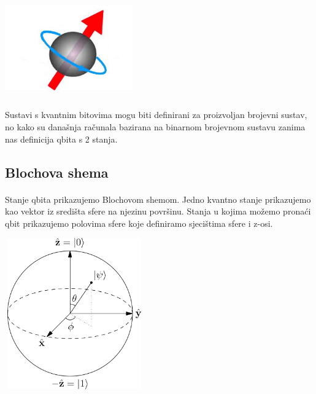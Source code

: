 \documentclass[times, utf8, zavrsni]{fer}
\begin{document}
\begin{center}
\includegraphics[width=55mm, height=40mm]{spin}
\end{center}

\paragraph{}
Sustavi s kvantnim bitovima mogu biti definirani za proizvoljan brojevni sustav, no kako su današnja računala bazirana na binarnom brojevnom sustavu zanima nas definicija qbita s 2 stanja.

\subsection{Blochova shema}
\paragraph{}
Stanje qbita prikazujemo Blochovom shemom. Jedno kvantno stanje prikazujemo kao vektor iz središta sfere na njezinu površinu. Stanja u kojima možemo pronaći qbit prikazujemo polovima sfere koje definiramo sjecištima sfere i z-osi.

\begin{center}
\includegraphics[width=60mm, height=65mm]{bloch}
\end{center}
\end{document}
